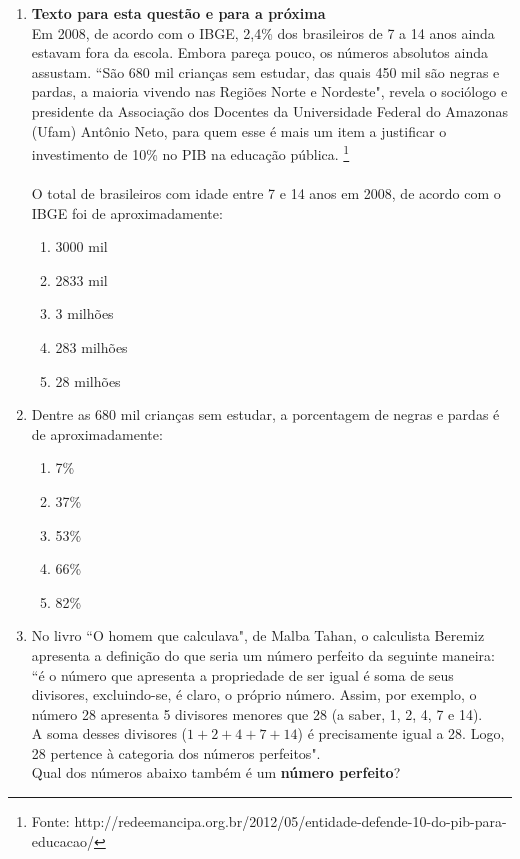 \documentclass[10pt,a4paper]{article}
\begin{document}
\begin{multicols}{2}

\begin{enumerate}


	\item \textbf{Texto para esta quest\~ao e para a pr\'oxima}\\
	Em 2008, de acordo com o IBGE, 2,4\% dos brasileiros de 7 a 14 anos ainda estavam fora da escola. Embora pare\c{c}a pouco, os n\'umeros absolutos ainda assustam. ``S\~ao 680 mil crian\c{c}as sem estudar, das quais 450 mil s\~ao negras e pardas, a maioria vivendo nas Regi\~oes Norte e Nordeste", revela o soci\'ologo e presidente da Associa\c{c}\~ao dos Docentes da Universidade Federal do Amazonas (Ufam) Ant\^onio Neto, para quem esse \'e mais um item a justificar o investimento de 10\% no PIB na educa\c{c}\~ao p\'ublica. \footnote{Fonte: http://redeemancipa.org.br/2012/05/entidade-defende-10-do-pib-para-educacao/} \\ \\
O total de brasileiros com idade entre 7 e 14 anos em 2008, de acordo com o IBGE foi de aproximadamente:
		\begin{enumerate}
		\item 3000 mil
		\item 2833 mil
		\item 3 milh\~oes
		\item 283 milh\~oes
		\item 28 milh\~oes
		\end{enumerate}

	\item Dentre as 680 mil crian\c{c}as sem estudar, a porcentagem de negras e pardas \'e de aproximadamente:

		\begin{enumerate}
		\item 7\%
		\item 37\%
		\item 53\%
		\item 66\%
		\item 82\%
		\end{enumerate}

	\item No livro ``O homem que calculava", de Malba Tahan, o calculista Beremiz apresenta a defini\c{c}\~ao do que seria um n\'umero perfeito da seguinte maneira: ``\'e o n\'umero que apresenta a propriedade de ser igual \'e soma de seus divisores, excluindo-se, \'e claro, o pr\'oprio n\'umero. Assim, por exemplo, o n\'umero 28 apresenta 5 divisores menores que 28 (a saber, 1, 2, 4, 7 e 14). \\
	A soma desses divisores ($1+2+4+7+14$) \'e precisamente igual a 28. Logo, 28 pertence \`a  categoria dos n\'umeros perfeitos". \\
	Qual dos n\'umeros abaixo tamb\'em \'e um \textbf{n\'umero perfeito}?


\end{enumerate}
\end{multicols}
\end{document}
